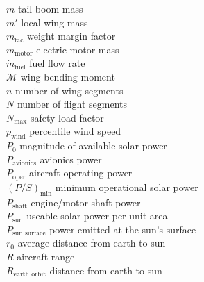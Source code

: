 \begin{multicols}{2}
\begin{tabbing}
$m$ \> tail boom mass \\ %
$m'$ \> local wing mass \\ %
$m_{\text{fac}}$ \> weight margin factor \\
$m_{\text{motor}}$ \> electric motor mass \\
$\dot{m}_{\text{fuel}}$ \> fuel flow rate \\ %
$\mathcal{M}$ \> wing bending moment \\ %
$n$ \> number of wing segments \\
$N$ \> number of flight segments \\
$N_{\text{max}}$ \> safety load factor\\
$p_{\text{wind}}$ \> percentile wind speed \\
$P_{0}$ \> magnitude of available solar power \\ %
$P_{\text{avionics}}$ \> avionics power \\ %
$P_{\text{oper}}$ \> aircraft operating power \\ %
$(P/S)_{\text{min}}$ \> minimum operational solar power \\ %
$P_{\text{shaft}}$ \> engine/motor shaft power \\ %
$P_{\text{sun}}$ \> useable solar power per unit area \\ %
$P_{\text{sun surface}}$ \> power emitted at the sun's surface \\ %
$r_0$ \> average distance from earth to sun \\
$R$ \> aircraft range \\ %
$R_{\text{earth orbit}}$ \> distance from earth to sun \\

\end{tabbing}
\end{multicols}
